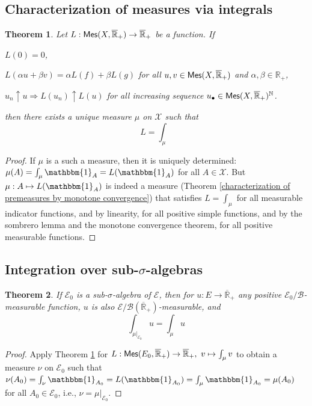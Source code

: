 \documentclass[11pt, a4paper, openany]{book}
\newtheorem{thm}{Theorem}\newtheorem{lem}{Lemma}\newtheorem{crl}{Corollary}
\theoremstyle{definition}
\newcommand{\cat}[1]{\textup{\textsf{#1}}}
\newcommand{\er}{\overline{\mathbb{R}}}
\newenvironment{tight_enumerate}{\begin{enumerate}\itemsep -0.2em}{\end{enumerate}}
\begin{document}
\subsection{Characterization of measures via integrals}
    \begin{thm}\label{Characterization of measures via integrals}
        Let $L:\cat{Mes}(X,\er_+)\rightarrow \er_+$ be a function. If
        \begin{tight_enumerate}
            \item $L(0)=0$,
            \item $L(\alpha u+\beta v)=\alpha L(f)+\beta L(g)$ for all $u,v\in\cat{Mes}(X,\er_+)$ and $\alpha,\beta\in\mathbb{R}_+$,
            \item $u_n\uparrow u\Rightarrow L(u_n)\uparrow L(u)$ for all increasing sequence $u_\bullet\in\cat{Mes}(X,\er_+)^\mathbb{N}$.
        \end{tight_enumerate}
        then there exists a unique measure $\mu$ on $\mathscr{X}$ such that
        \[
            L=\int_\mu
        \]
    \end{thm}
    \begin{proof}
        If $\mu$ is a such a measure, then it is uniquely determined: $\mu(A)=\int_\mu\mathbbm{1}_A=L(\mathbbm{1}_A)$ for all $A\in\mathscr{X}$. But $\mu:A\mapsto L(\mathbbm{1}_A)$ is indeed a measure (Theorem \ref{characterization of premeasures by monotone convergence}) that satisfies $L=\int_\mu$ for all measurable indicator functions, and by linearity, for all positive simple functions, and by the sombrero lemma and the monotone convergence theorem, for all positive measurable functions.
    \end{proof}
\subsection{Integration over sub-\texorpdfstring{$\sigma$}{sigma}-algebras}
    \begin{thm}
        If $\mathscr{E}_0$ is a sub-$\sigma$-algebra of $\mathscr{E}$, then for $u:E\rightarrow \er_+$ any positive $\mathscr{E}_0/\mathscr{B}$-measurable function, $u$ is also $\mathscr{E}/\mathscr{B}(\er_+)$-measurable, and
        \[
            \int_{\mu|_{\mathscr{E}_0}}u=\int_{\mu} u
        \]
    \end{thm}
    \begin{proof}
        Apply Theorem \ref{Characterization of measures via integrals} for $L:\cat{Mes}(E_0,\er_+)\rightarrow \er_+,\,\,v\mapsto \int_\mu v$ to obtain a measure $\nu$ on $\mathscr{E}_0$ such that $\nu(A_0)=\int_\nu \mathbbm{1}_{A_0}=L(\mathbbm{1}_{A_0})=\int_\mu\mathbbm{1}_{A_0}=\mu(A_0)$ for all $A_0\in\mathscr{E}_0$, i.e., $\nu=\mu|_{\mathscr{E}_0}$.
    \end{proof}
\end{document}

